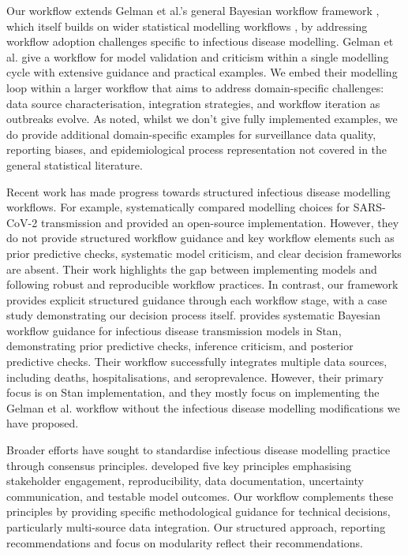 \documentclass{article}
\begin{document}
Our workflow extends Gelman et al.'s general Bayesian workflow framework \citep{gelman2020bayesian}, which itself builds on wider statistical modelling workflows \citep{box1979robustness,Box1980,green2003highly}, by addressing workflow adoption challenges specific to infectious disease modelling.
Gelman et al. give a workflow for model validation and criticism within a single modelling cycle with extensive guidance and practical examples.
We embed their modelling loop within a larger workflow that aims to address domain-specific challenges: data source characterisation, integration strategies, and workflow iteration as outbreaks evolve. 
As noted, whilst we don't give fully implemented examples, we do provide additional domain-specific examples for surveillance data quality, reporting biases, and epidemiological process representation not covered in the general statistical literature.
 
Recent work has made progress towards structured infectious disease modelling workflows.
For example, \citet{bouman2024bayesian} systematically compared modelling choices for \ac{SARS-CoV-2} transmission and provided an open-source implementation.
However, they do not provide structured workflow guidance and key workflow elements such as prior predictive checks, systematic model criticism, and clear decision frameworks are absent.
Their work highlights the gap between implementing models and following robust and reproducible workflow practices.
In contrast, our framework provides explicit structured guidance through each workflow stage, with a case study demonstrating our decision process itself.
\citet{grinsztajn2021bayesian} provides systematic Bayesian workflow guidance for infectious disease transmission models in Stan, demonstrating prior predictive checks, inference criticism, and posterior predictive checks. 
Their workflow successfully integrates multiple data sources, including deaths, hospitalisations, and seroprevalence. 
However, their primary focus is on Stan implementation, and they mostly focus on implementing the Gelman et al. workflow without the infectious disease modelling modifications we have proposed.

Broader efforts have sought to standardise infectious disease modelling practice through consensus principles. \citet{Behrend2020-au} developed five key principles emphasising stakeholder engagement, reproducibility, data documentation, uncertainty communication, and testable model outcomes. 
Our workflow complements these principles by providing specific methodological guidance for technical decisions, particularly multi-source data integration.
Our structured approach, reporting recommendations and focus on modularity reflect their recommendations.
\end{document}
